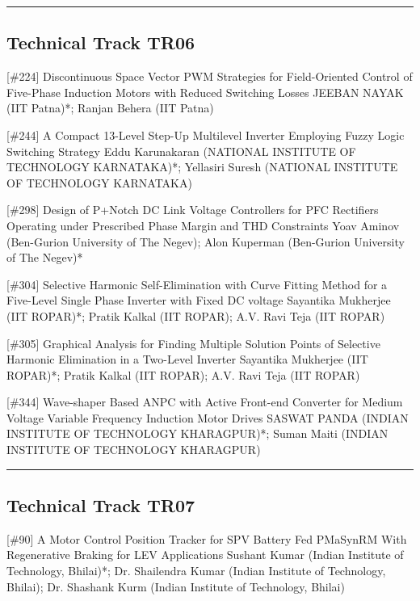 \hrule  \subsection{Technical Track TR06}\nopagebreak {} \begin{abstract_online} {[\#224] Discontinuous Space Vector PWM Strategies for Field-Oriented Control of Five-Phase Induction Motors with Reduced Switching Losses} {} {JEEBAN NAYAK (IIT Patna)*; Ranjan Behera (IIT Patna)} {}  \end{abstract_online} 
{} \begin{abstract_online} {[\#244] A Compact 13-Level Step-Up Multilevel Inverter Employing Fuzzy Logic Switching Strategy} {} {Eddu Karunakaran (NATIONAL INSTITUTE OF TECHNOLOGY KARNATAKA)*; Yellasiri Suresh (NATIONAL INSTITUTE OF TECHNOLOGY KARNATAKA)} {}  \end{abstract_online} 
{} \begin{abstract_online} {[\#298] Design of P+Notch DC Link Voltage Controllers for PFC Rectifiers Operating under Prescribed Phase Margin and THD Constraints} {} {Yoav Aminov (Ben-Gurion University of The Negev); Alon Kuperman (Ben-Gurion University of The Negev)*} {}  \end{abstract_online} 
{} \begin{abstract_online} {[\#304] Selective Harmonic Self-Elimination with Curve Fitting Method for a Five-Level Single Phase Inverter with Fixed DC voltage} {} {Sayantika Mukherjee (IIT ROPAR)*; Pratik Kalkal (IIT ROPAR); A.V. Ravi Teja (IIT ROPAR)} {}  \end{abstract_online} 
{} \begin{abstract_online} {[\#305] Graphical Analysis for Finding Multiple Solution Points of Selective Harmonic Elimination in a Two-Level Inverter} {} {Sayantika Mukherjee (IIT ROPAR)*; Pratik Kalkal (IIT ROPAR); A.V. Ravi Teja (IIT ROPAR)} {}  \end{abstract_online} 
{} \begin{abstract_online} {[\#344] Wave-shaper Based ANPC with Active Front-end Converter for Medium Voltage Variable Frequency Induction Motor Drives } {} {SASWAT PANDA (INDIAN INSTITUTE OF TECHNOLOGY KHARAGPUR)*; Suman  Maiti (INDIAN INSTITUTE OF TECHNOLOGY KHARAGPUR)} {}  \end{abstract_online} 
\hrule  \subsection{Technical Track TR07}\nopagebreak {} \begin{abstract_online} {[\#90] A Motor Control Position Tracker for SPV Battery Fed PMaSynRM With Regenerative Braking for LEV Applications } {} {Sushant Kumar (Indian Institute of Technology, Bhilai)*; Dr. Shailendra  Kumar (Indian Institute of Technology, Bhilai); Dr. Shashank Kurm (Indian Institute of Technology, Bhilai)} {}  \end{abstract_online} 

